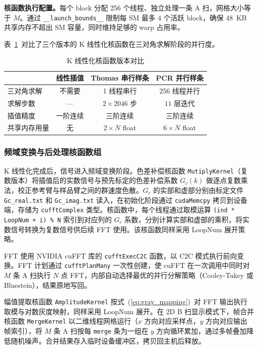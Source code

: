\textbf{核函数执行配置。}每个 block 分配 256 个线程、独立处理一条 A 扫，网格大小等于 $M$。通过 \texttt{\_\_launch\_bounds\_\_} 限制每 SM 最多 4 个活跃 block，确保 48~KB 共享内存不超出 SM 容量，同时维持足够的 warp 占用率。

表~\ref{tab:spline_comparison}~对比了三个版本的 K 线性化核函数在三对角求解阶段的并行度。

\begin{table}[htbp]
\centering
\caption{K 线性化核函数版本对比}
\label{tab:spline_comparison}
\begin{tabular}{lccc}
\toprule
 & 线性插值 & Thomas 串行样条 & PCR 并行样条 \\
\midrule
三对角求解 & 不需要 & 1 线程串行 & 256 线程并行 \\
求解步数 & — & $2 \times 2046$ 步 & $11$ 层迭代 \\
插值精度 & 一阶连续 & 三阶连续 & 三阶连续 \\
共享内存用量 & 无 & $2 \times N$ float & $6 \times N$ float \\
\bottomrule
\end{tabular}
\end{table}

\subsubsection{频域变换与后处理核函数组}

K 线性化完成后，信号进入频域变换阶段。色差补偿核函数 \texttt{MutiplyKernel}（复数版本）将插值后的实数信号与预先标定的色差补偿系数 $G_c(k)$ 做逐点复数乘法，校正参考臂与样品臂之间的群速度色散。$G_c$ 的实部和虚部分别由标定文件 \texttt{Gc\_real.txt} 和 \texttt{Gc\_imag.txt} 读入，在初始化阶段通过 \texttt{cudaMemcpy} 拷贝到设备端，存储为 \texttt{cufftComplex} 类型。核函数中，每个线程通过取模运算 \texttt{(ind * LoopNum + i) \% N} 索引到对应列的 $G_c$ 系数，分别计算实部和虚部的乘积，将实数信号转换为复数信号供后续 FFT 使用。该核函数同样采用 LoopNum 展开策略。

FFT 使用 NVIDIA cuFFT 库的 \texttt{cufftExecC2C} 函数，以 C2C 模式执行前向变换。FFT 计划通过 \texttt{cufftPlanMany} 一次性创建，使 cuFFT 在一次调用中同时对 $M$ 条 A 扫执行 $N$ 点 FFT，内部自动选择最优的并行分解策略（Cooley-Tukey 或 Bluestein），结果原地写回。

幅值提取核函数 \texttt{AmplitudeKernel} 按式~(\ref{eq:gray_mapping})~对 FFT 输出执行取模与对数灰度映射，同样采用 LoopNum 展开。在 2D B 扫显示模式下，帧合并核函数 \texttt{MergeKernel} 以二维线程网格运行（$x$ 方向对应采样点，$y$ 方向对应输出帧索引），将 $M$ 条 A 扫按每 \texttt{merge} 条为一组在 $y$ 方向循环累加，通过多帧叠加降低随机噪声。合并结果存入临时设备缓冲区，拷贝回主机后释放。

